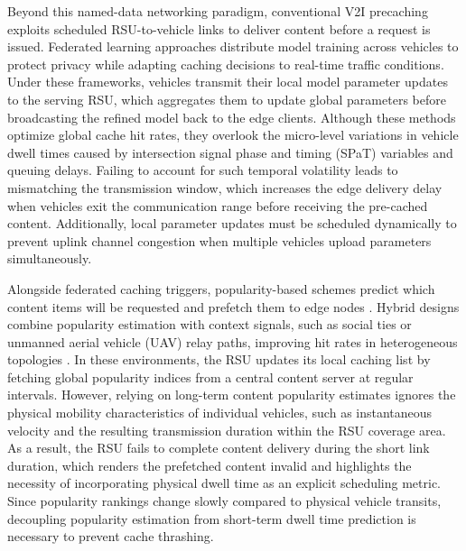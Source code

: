 \documentclass[journal]{IEEEtran}
\begin{document}
Beyond this named-data networking paradigm, conventional V2I precaching exploits scheduled RSU-to-vehicle links to deliver content before a request is issued. Federated learning approaches \cite{16,17,18} distribute model training across vehicles to protect privacy while adapting caching decisions to real-time traffic conditions. Under these frameworks, vehicles transmit their local model parameter updates to the serving RSU, which aggregates them to update global parameters before broadcasting the refined model back to the edge clients. Although these methods optimize global cache hit rates, they overlook the micro-level variations in vehicle dwell times caused by intersection signal phase and timing (SPaT) variables and queuing delays. Failing to account for such temporal volatility leads to mismatching the transmission window, which increases the edge delivery delay when vehicles exit the communication range before receiving the pre-cached content. Additionally, local parameter updates must be scheduled dynamically to prevent uplink channel congestion when multiple vehicles upload parameters simultaneously.

Alongside federated caching triggers, popularity-based schemes predict which content items will be requested and prefetch them to edge nodes \cite{5,6,19}. Hybrid designs combine popularity estimation with context signals, such as social ties or unmanned aerial vehicle (UAV) relay paths, improving hit rates in heterogeneous topologies \cite{20,21,22}. In these environments, the RSU updates its local caching list by fetching global popularity indices from a central content server at regular intervals. However, relying on long-term content popularity estimates ignores the physical mobility characteristics of individual vehicles, such as instantaneous velocity and the resulting transmission duration within the RSU coverage area. As a result, the RSU fails to complete content delivery during the short link duration, which renders the prefetched content invalid and highlights the necessity of incorporating physical dwell time as an explicit scheduling metric. Since popularity rankings change slowly compared to physical vehicle transits, decoupling popularity estimation from short-term dwell time prediction is necessary to prevent cache thrashing.
\end{document}
